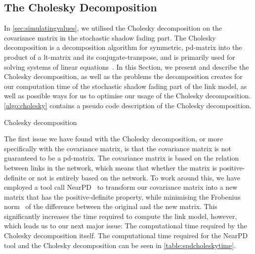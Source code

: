 \subsection{The Cholesky Decomposition}\label{sec:cholesky}
In \autoref{sec:simulatingvalues}, we utilised the Cholesky decomposition on the covariance matrix in the stochastic shadow fading part. The Cholesky decomposition is a decomposition algorithm for \gls{symmetric}, \gls{pd-matrix} into the product of a \gls{lt-matrix} and its \gls{conjugate-transpose}, and is primarily used for solving systems of linear equations~\cite{Press:2007:NRE:1403886}. In this Section, we present and describe the Cholesky decomposition, as well as the problems the decomposition creates for our computation time of the stochastic shadow fading part of the link model, as well as possible ways for us to optimise our usage of the Cholesky decomposition. \autoref{algo:cholesky} contains a pseudo code description of the Cholesky decomposition. \medbreak

\begin{algorithm}[H]
    \DontPrintSemicolon
    \caption{Cholesky decomposition}
    \label{algo:cholesky}
\end{algorithm}
\medbreak
The first issue we have found with the Cholesky decomposition, or more specifically with the covariance matrix, is that the covariance matrix is not guaranteed to be a \gls{pd-matrix}. The covariance matrix is based on the relation between links in the network, which means that whether the matrix is positive-definite or not is entirely based on the network. To work around this, we have employed a tool call NearPD~\cite{website:nearPD} to transform our covariance matrix into a new matrix that has the positive-definite property, while minimising the Frobenius norm~\cite{website:frobieniusnorm} of the difference between the original and the new matrix. This significantly increases the time required to compute the link model, however, which leads us to our next major issue: The computational time required by the Cholesky decomposition itself. The computational time required for the NearPD tool and the Cholesky decomposition can be seen in \autoref{table:spdcholeskytime}.\smallbreak

